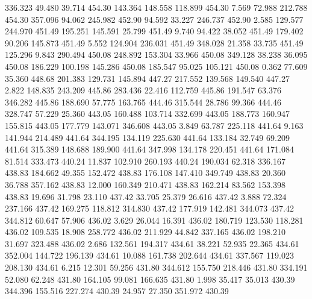  336.323   49.480   39.714       454.30
 143.364  148.558  118.899       454.30
   7.569   72.988  212.788       454.30
 357.096   94.062  245.982       452.90
  94.592   33.227  246.737       452.90
   2.585  129.577  244.970       451.49
 195.251  145.591   25.799       451.49
   9.740   94.422   38.052       451.49
 179.402   90.206  145.873       451.49
   5.552  124.904  236.031       451.49
 348.028   21.358   33.735       451.49
 125.296    9.843  290.494       450.08
 248.892  153.304   33.966       450.08
 349.128   38.238   36.095       450.08
 186.229  100.198  145.286       450.08
 185.547   95.025  105.121       450.08
   0.362   77.609   35.360       448.68
 201.383  129.731  145.894       447.27
 217.552  139.568  149.540       447.27
   2.822  148.835  243.209       445.86
 283.436   22.416  112.759       445.86
 191.547   63.376  346.282       445.86
 188.690   57.775  163.765       444.46
 315.544   28.786   99.366       444.46
 328.747   57.229   25.360       443.05
 160.488  103.714  332.699       443.05
 188.773  160.947  155.815       443.05
 177.779  143.071  346.608       443.05
   3.849   63.787  225.118       441.64
   9.163  141.944  214.489       441.64
 344.195  134.119  225.630       441.64
 133.184   32.749   69.209       441.64
 315.389  148.688  189.900       441.64
 347.998  134.178  220.451       441.64
 171.084   81.514  333.473       440.24
  11.837  102.910  260.193       440.24
 190.034   62.318  336.167       438.83
 184.662   49.355  152.472       438.83
 176.108  147.410  349.749       438.83
  20.360   36.788  357.162       438.83
  12.000  160.349  210.471       438.83
 162.214   83.562  153.398       438.83
  19.696   31.798   23.110       437.42
  33.705   25.379   26.616       437.42
   3.888   72.324  237.166       437.42
 169.275  118.812  314.830       437.42
 177.919  142.481  344.073       437.42
 344.812   60.647   57.906       436.02
   3.629   26.044   16.391       436.02
 180.719  123.530  118.281       436.02
 109.535   18.908  258.772       436.02
 211.929   44.842  337.165       436.02
 198.210   31.697  323.488       436.02
   2.686  132.561  194.317       434.61
  38.221   52.935   22.365       434.61
 352.004  144.722  196.139       434.61
  10.088  161.738  202.644       434.61
 337.567  119.023  208.130       434.61
   6.215   12.301   59.256       431.80
 344.612  155.750  218.446       431.80
 334.191   52.080   62.248       431.80
 164.105   99.081  166.635       431.80
   1.998   35.417   35.013       430.39
 344.396  155.516  227.274       430.39
  24.957   27.350  351.972       430.39

